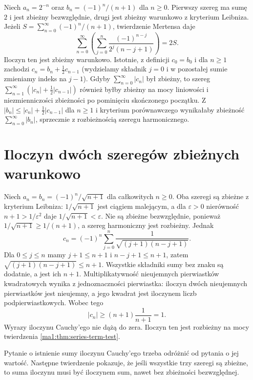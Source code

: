 \begin{przyklad}
Niech $a_n=2^{-n}$ oraz $b_n=(-1)^n/(n+1)$ dla $n\ge0$. Pierwszy szereg ma sumę $2$ i jest zbieżny bezwzględnie, drugi jest zbieżny warunkowo z kryterium Leibniza. Jeżeli $S=\sum_{n=0}^\infty(-1)^n/(n+1)$, twierdzenie Mertensa daje
\[
 \sum_{n=0}^\infty\left(\sum_{j=0}^n\frac{(-1)^{n-j}}{2^j(n-j+1)}\right)=2S.
\]
Iloczyn ten jest zbieżny warunkowo. Istotnie, z definicji $c_0=b_0$ i dla $n\ge1$ zachodzi $c_n=b_n+\frac12c_{n-1}$ (wydzielamy składnik $j=0$ i w pozostałej sumie zmieniamy indeks na $j-1$). Gdyby $\sum_{n=0}^\infty|c_n|$ był zbieżny, to szereg $\sum_{n=1}^\infty(|c_n|+\frac12|c_{n-1}|)$ również byłby zbieżny na mocy liniowości i niezmienniczości zbieżności po pominięciu skończonego początku. Z $|b_n|\le |c_n|+\frac12|c_{n-1}|$ dla $n\ge1$ i kryterium porównawczego wynikałaby zbieżność $\sum_{n=0}^\infty|b_n|$, sprzecznie z rozbieżnością szeregu harmonicznego.
\end{przyklad}

\section{Iloczyn dwóch szeregów zbieżnych warunkowo}
\begin{przyklad}
\label{ma1:ex:divergent-cauchy-product}
Niech $a_n=b_n=(-1)^n/\sqrt{n+1}$ dla całkowitych $n\ge0$. Oba szeregi są zbieżne z kryterium Leibniza: $1/\sqrt{n+1}$ jest ciągiem malejącym, a dla $\varepsilon>0$ nierówność $n+1>1/\varepsilon^2$ daje $1/\sqrt{n+1}<\varepsilon$. Nie są zbieżne bezwzględnie, ponieważ $1/\sqrt{n+1}\ge1/(n+1)$, a szereg harmoniczny jest rozbieżny.
Jednak
\[
 c_n=(-1)^n\sum_{j=0}^n
       \frac1{\sqrt{(j+1)(n-j+1)}}.
\]
Dla $0\le j\le n$ mamy $j+1\le n+1$ i $n-j+1\le n+1$, zatem $\sqrt{(j+1)(n-j+1)}\le n+1$. Wszystkie składniki sumy bez znaku są dodatnie, a jest ich $n+1$. Multiplikatywność nieujemnych pierwiastków kwadratowych wynika z jednoznaczności pierwiastka: iloczyn dwóch nieujemnych pierwiastków jest nieujemny, a jego kwadrat jest iloczynem liczb podpierwiastkowych. Wobec tego
\[
 |c_n|\ge(n+1)\frac1{n+1}=1.
\]
Wyrazy iloczynu Cauchy'ego nie dążą do zera. Iloczyn ten jest rozbieżny na mocy twierdzenia \ref{ma1:thm:series-term-test}.
\end{przyklad}
Pytanie o istnienie sumy iloczynu Cauchy'ego trzeba odróżnić od pytania o jej wartość. Następne twierdzenie pokazuje, że jeśli wszystkie trzy szeregi są zbieżne, to suma iloczynu musi być iloczynem sum, nawet bez zbieżności bezwzględnej.

